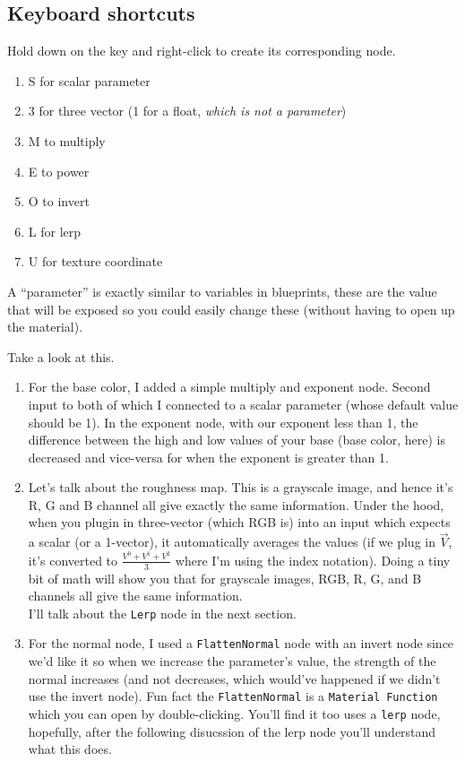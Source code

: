 \documentclass{article}
\begin{document}
\subsection{Keyboard shortcuts}
Hold down on the key and right-click to create its corresponding node.
\begin{enumerate}
    \item S for scalar parameter
    \item 3 for three vector (1 for a float, \emph{which is not a parameter})
    \item M to multiply
    \item E to power
    \item O to invert
    \item L for lerp
    \item U for texture coordinate
\end{enumerate}

A ``parameter'' is exactly similar to variables in blueprints, these are the value that will be exposed so you could easily change these (without having to open up the material).

Take a look at this.
\begin{enumerate}
    \item For the base color, I added a simple multiply and exponent node. Second input to both of which I connected to a scalar parameter (whose default value should be 1). In the exponent node, with our exponent less than 1, the difference between the high and low values of your base (base color, here) is decreased and vice-versa for when the exponent is greater than 1.
    \item Let's talk about the roughness map. This is a grayscale image, and hence it's R, G and B channel all give exactly the same information. Under the hood, when you plugin in three-vector (which RGB is) into an input which expects a scalar (or a 1-vector), it automatically averages the values (if we plug in $\vec{V}$, it's converted to $\frac{V^0+V^1+V^2}{3}$ where I'm using the index notation). Doing a tiny bit of math will show you that for grayscale images, RGB, R, G, and B channels all give the same information.  \\ I'll talk about the \verb|Lerp| node in the next section.
    \item For the normal node, I used a \verb|FlattenNormal| node with an invert node since we'd like it so when we increase the parameter's value, the strength of the normal increases (and not decreases, which would've happened if we didn't use the invert node). Fun fact the \verb|FlattenNormal| is a \verb|Material Function| which you can open by double-clicking. You'll find it too uses a \verb|lerp| node, hopefully, after the following disucssion of the lerp node you'll understand what this does.
\end{enumerate}
\end{document}
